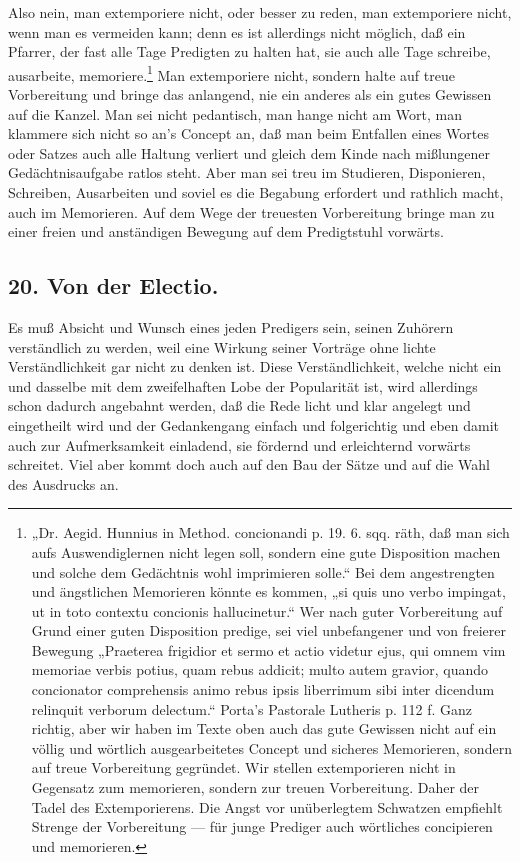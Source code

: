 Also nein, man extemporiere nicht, oder besser zu reden, man extemporiere nicht, wenn man es vermeiden kann; denn es ist allerdings nicht möglich, daß ein Pfarrer, der fast alle Tage Predigten zu halten hat, sie auch alle Tage schreibe, ausarbeite, memoriere.\footnote{„Dr. Aegid. Hunnius in Method. concionandi p. 19. 6. sqq. räth, daß man sich aufs Auswendiglernen nicht legen soll, sondern eine gute Disposition machen und solche dem Gedächtnis wohl imprimieren solle.“ Bei dem angestrengten und ängstlichen Memorieren könnte es kommen, „si quis uno verbo impingat, ut in toto contextu concionis hallucinetur.“ Wer nach guter Vorbereitung auf Grund einer guten Disposition predige, sei viel unbefangener und von freierer Bewegung „Praeterea frigidior et sermo et actio videtur ejus, qui omnem vim memoriae verbis potius, quam rebus addicit; multo autem gravior, quando concionator comprehensis animo rebus ipsis liberrimum sibi inter dicendum relinquit verborum delectum.“ Porta's Pastorale Lutheris p. 112 f. Ganz richtig, aber wir haben im Texte oben auch das gute Gewissen nicht auf ein völlig und wörtlich ausgearbeitetes Concept und sicheres Memorieren, sondern auf treue Vorbereitung gegründet. Wir stellen extemporieren nicht in Gegensatz zum memorieren, sondern zur treuen Vorbereitung. Daher der Tadel des Extemporierens. Die Angst vor unüberlegtem Schwatzen empfiehlt Strenge der Vorbereitung — für junge Prediger auch wörtliches concipieren und memorieren.} Man extemporiere nicht, sondern
halte auf treue Vorbereitung und bringe das anlangend, nie ein anderes als ein gutes Gewissen auf die Kanzel. Man sei nicht pedantisch, man hange nicht am Wort, man klammere sich nicht so an's Concept an, daß man beim Entfallen eines Wortes oder Satzes auch alle Haltung verliert und gleich dem Kinde nach mißlungener Gedächtnisaufgabe ratlos steht. Aber man sei treu im Studieren, Disponieren, Schreiben, Ausarbeiten und soviel es die Begabung erfordert und rathlich macht, auch im Memorieren. Auf dem Wege der treuesten Vorbereitung bringe man zu einer freien und anständigen Bewegung auf dem Predigtstuhl vorwärts.

\subsection*{20. Von der Electio.}

Es muß Absicht und Wunsch eines jeden Predigers sein, seinen Zuhörern verständlich zu werden, weil eine Wirkung seiner Vorträge ohne lichte Verständlichkeit gar nicht zu denken ist. Diese Verständlichkeit, welche nicht ein und dasselbe mit dem zweifelhaften Lobe der Popularität ist, wird allerdings schon dadurch angebahnt werden, daß die Rede licht und klar angelegt und eingetheilt wird und der Gedankengang einfach und folgerichtig und eben damit auch zur Aufmerksamkeit einladend, sie fördernd und erleichternd vorwärts schreitet. Viel aber kommt doch auch auf den Bau der Sätze und auf die Wahl des Ausdrucks an.


